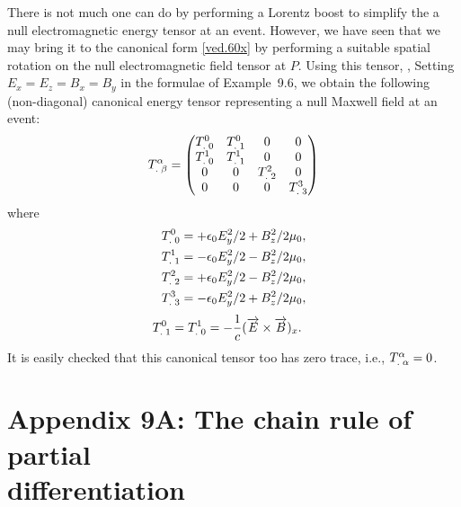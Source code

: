 There is not much one can do by performing a Lorentz boost 
to simplify the a null  electromagnetic energy tensor at 
an event. However, we have seen that we may bring it to the 
canonical form \eqref{ved.60x} by performing a suitable 
spatial rotation on the null  electromagnetic field 
tensor at $P$. Using this tensor,  \ie, Setting 
$E_x=E_z=B_x=B_y$ in the formulae of Example~9.6, we obtain 
the following (non-diagonal) canonical energy tensor 
representing a null Maxwell field at an event:
\begin{align}\label{rcm.110}
{\ensuremath{{T}^{{\alpha}}_{.\;{\beta}}}}
=\begin{pmatrix}
{\ensuremath{{T}^{0}_{.\;0}}}  & {{T}^{0}_{.\;1}} & 0  & 0\\
{{T}^{1}_{.\;0}}  & {{T}^{1}_{.\;1}} &0 & 0\\
0 & 0 & {{T}^{2}_{.\;2}} &  0 \\
0 &   0     &   0    & {{T}^{3}_{.\;3}}
\end{pmatrix}
\end{align}
where
\begin{align}\label{rcm.111}
{\ensuremath{{T}^{0}_{.\;0}}}&=+\epsilon_0 E_y^2/2+B_z^2/2\mu_0,
\\\label{rcm.112}
{\ensuremath{{T}^{1}_{.\;1}}}&=-\epsilon_0 E_y^2/2-B_z^2/2\mu_0,
\\\label{rcm.113}
{\ensuremath{{T}^{2}_{.\;2}}}&=+\epsilon_0 E_y^2/2-B_z^2/2\mu_0,
\\\label{rcm.114}
{\ensuremath{{T}^{3}_{.\;3}}}&=-\epsilon_0 E_y^2/2+B_z^2/2\mu_0,
\end{align}
\begin{align}\label{rcm.115}
{\ensuremath{{T}^{0}_{.\;1}}}&={{T}^{1}_{.\;0}}
=-\frac{1}{c}(\overrightarrow{E}\times \overrightarrow{B})_x.
\end{align}
It is easily checked that this canonical tensor too has zero
trace, i.e., ${{T}^{{\alpha}}_{.\;{\alpha}}}=0$.
\section*{Appendix 9A: The chain rule of partial\\  
differentiation}

